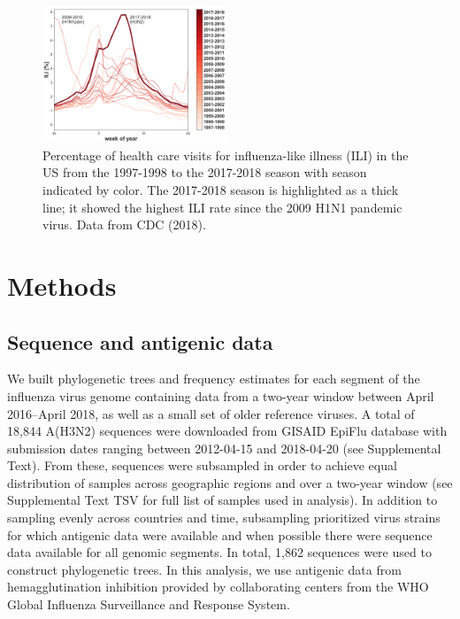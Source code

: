 \begin{figure}[t]
    \begin{center}
    \includegraphics[width=0.49\textwidth]{figures/ili_1997_2018.png}
    \end{center}
    \caption{Percentage of health care visits for influenza-like illness (ILI) in the US from the 1997-1998 to the 2017-2018 season with season indicated by color. The 2017-2018 season is highlighted as a thick line; it showed the highest ILI rate since the 2009 H1N1 pandemic virus. Data from CDC (2018).}
    \label{fig:ili}
\end{figure}

\section*{Methods}
\subsection*{Sequence and antigenic data}
We built phylogenetic trees and frequency estimates for each segment of the influenza virus genome containing data from a two-year window between April 2016--April 2018, as well as a small set of older reference viruses.
A total of 18,844 A(H3N2) sequences were downloaded from GISAID EpiFlu database with submission dates ranging between 2012-04-15 and 2018-04-20 (see Supplemental Text).
From these, sequences were subsampled in order to achieve equal distribution of samples across geographic regions and over a two-year window (see Supplemental Text TSV for full list of samples used in analysis).
In addition to sampling evenly across countries and time, subsampling prioritized virus strains for which antigenic data were available and when possible there were sequence data available for all genomic segments.
In total, 1,862 sequences were used to construct phylogenetic trees.
In this analysis, we use antigenic data from hemagglutination inhibition provided by collaborating centers from the WHO Global Influenza Surveillance and Response System.

